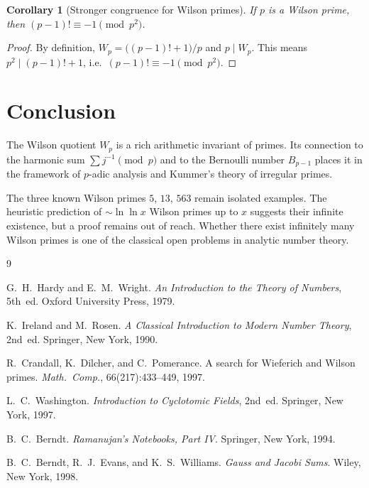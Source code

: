 \documentclass[12pt,a4paper]{amsart}
\newtheorem{corollary}[theorem]{Corollary}
\theoremstyle{definition}
\begin{document}
\begin{corollary}[Stronger congruence for Wilson primes]\label{cor:stronger}
  If $p$ is a Wilson prime, then $(p-1)! \equiv -1 \pmod{p^2}$.
\end{corollary}

\begin{proof}
  By definition, $W_p = \bigl((p-1)!+1\bigr)/p$ and $p \mid W_p$.
  This means $p^2 \mid (p-1)!+1$, i.e.\ $(p-1)! \equiv -1 \pmod{p^2}$.
\end{proof}

\section{Conclusion}

The Wilson quotient $W_p$ is a rich arithmetic invariant of primes.
Its connection to the harmonic sum $\sum j^{-1} \pmod p$ and to the
Bernoulli number $B_{p-1}$ places it in the framework of $p$-adic analysis
and Kummer's theory of irregular primes.

The three known Wilson primes $5$, $13$, $563$ remain isolated examples.
The heuristic prediction of $\sim \ln\ln x$ Wilson primes up to $x$ suggests
their infinite existence, but a proof remains out of reach.
Whether there exist infinitely many Wilson primes is one of the classical
open problems in analytic number theory.

\begin{thebibliography}{9}

G.~H.~Hardy and E.~M.~Wright.
\newblock \emph{An Introduction to the Theory of Numbers}, 5th~ed.
\newblock Oxford University Press, 1979.

K.~Ireland and M.~Rosen.
\newblock \emph{A Classical Introduction to Modern Number Theory}, 2nd~ed.
\newblock Springer, New York, 1990.

R.~Crandall, K.~Dilcher, and C.~Pomerance.
\newblock A search for Wieferich and Wilson primes.
\newblock \emph{Math.\ Comp.}, 66(217):433--449, 1997.

L.~C.~Washington.
\newblock \emph{Introduction to Cyclotomic Fields}, 2nd~ed.
\newblock Springer, New York, 1997.

B.~C.~Berndt.
\newblock \emph{Ramanujan's Notebooks, Part IV}.
\newblock Springer, New York, 1994.

B.~C.~Berndt, R.~J.~Evans, and K.~S.~Williams.
\newblock \emph{Gauss and Jacobi Sums}.
\newblock Wiley, New York, 1998.

\end{thebibliography}
\end{document}
